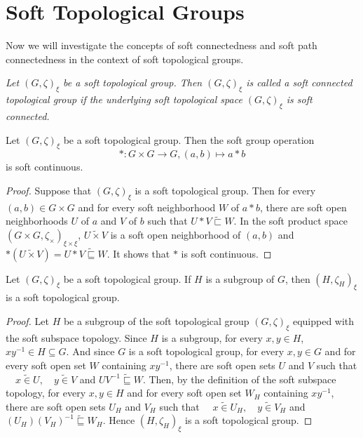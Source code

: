 \documentclass[preprint,12pt]{elsarticle}
\begin{document}
\section{ Soft Topological Groups}
Now we will investigate the concepts of soft connectedness and soft path connectedness in the context of soft topological groups.

\begin{defn}\em{
Let $ (G,\zeta)_\xi$  be a soft topological group. Then $ (G,\zeta)_\xi$ is called a
soft connected topological group if the underlying soft topological space
$ (G,\zeta)_\xi$ is soft connected.}
\end{defn}

\begin{thm}\label{grpoperationcont}Let $(G,\zeta)_\xi$ be a soft topological group. Then the soft group operation
\[\ast\colon G\times G\to G, (a,b)\mapsto a\ast b\]
is soft continuous.
\end{thm}
\begin{proof} Suppose that  $(G,\zeta)_\xi$ is a soft topological group.  Then for every  $(a,b) \in G \times G $  and for every soft neighborhood  $W$ of $a \ast b$, there are soft open neighborhoods  $U$ of $a$  and  $V$  of  $b$ such that  $U \ast V  \widetilde{\sqsubset} W$. In the soft product space $(G\times G,\zeta_\times)_{\xi\times \xi}$,  $U\widetilde{\times} V$
 is a soft open neighborhood of $(a,b)$ and $\ast(U\widetilde{\times} V)=U \ast V  \widetilde{\sqsubseteq} W$. It shows that $\ast$ is soft continuous.
 \end{proof}
\begin{prop}\label{softsubgrp}
 Let $(G,\zeta)_\xi$ be a soft topological group.  If $H$ is a subgroup of $G$, then \((  H,\zeta_H)_\xi \) is a soft topological group.
\end{prop}
\begin{proof}
Let \(H \)  be a subgroup of the soft topological group $(G,\zeta)_\xi$ equipped with the soft subspace topology.
 Since $H$ is a subgroup, for every $x,y\in H$, $xy^{-1}\in H\subseteq G$. And since $G$ is a soft topological group, for every \( x, y \in G \) and for every soft open set \( W \) containing \( x y^{-1} \), there are soft open sets \( U \) and \( V \) such that
\(
\quad x \widetilde{\in}  U, \quad y \widetilde{\in} V\) and \( U V^{-1} \widetilde{\sqsubseteq} W
\). Then, by the definition of the soft subspace topology, for every \( x, y \in H \) and for every soft open set \( W_H \) containing \( x y^{-1} \), there are soft open sets \( U_H  \) and \( V_H  \) such that
\(
\quad x \widetilde{\in}  U_H  , \quad y \widetilde{\in} V_H \) and \( (U_ H ) {(V_ H)} ^{-1} \widetilde{\sqsubseteq} W_ H
\). Hence \((  H,\zeta_H)_\xi \) is a soft topological group.
\end{proof}
\end{document}
